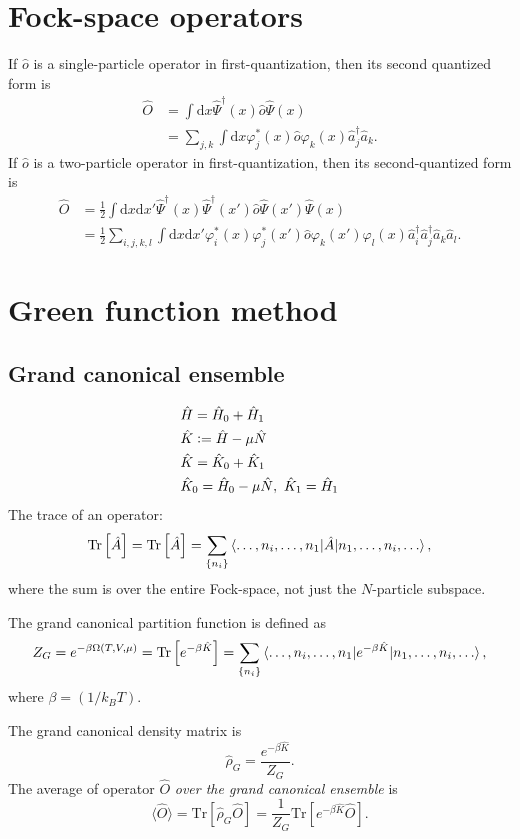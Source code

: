 \documentclass[11pt, a4paper]{article}
\newcommand{\dd}{\mathrm{d}}
\newcommand{\Tr}[1]{\mathrm{Tr}\left[#1\right]}
\begin{document}
\section{Fock-space operators}
If $\hat o$ is a single-particle operator in first-quantization, then its second quantized form is 
\begin{align*}
    \hat O &= \int\dd x\hat\Psi^{\dagger}(x)\hat o\hat\Psi(x) \\
    & = \sum\limits_{j,k} \int \dd x \varphi^*_j(x) \hat o \varphi_k(x) \hat a_j^{\dagger}\hat a_k.
\end{align*} 
If $\hat o$ is a two-particle operator in first-quantization, then its second-quantized form is 
\begin{align*}
    \hat O &= \frac{1}{2} \int\dd x \dd x' \hat\Psi^{\dagger}(x) \hat\Psi^{\dagger}(x') \hat o \hat\Psi(x') \hat\Psi(x) \\
    & = \frac{1}{2} \sum\limits_{i,j,k,l} \int\dd x \dd x' \varphi^*_i(x)\varphi^*_j(x') \hat o \varphi_k(x')\varphi_l(x)
    \hat a_i^{\dagger}\hat a_j^{\dagger}\hat a_k\hat a_l.
\end{align*}


\section{Green function method}
\subsection{Grand canonical ensemble}
\begin{align*}
    &\hat H = \hat H_0 + \hat H_1\\
    &\hat K \vcentcolon= \hat H - \mu \hat N\\
    &\hat K = \hat K_0 + \hat K_1\\
    &\hat K_0 = \hat H_0 - \mu \hat N, ~ \hat K_1 = \hat H_1
\end{align*}
The trace of an operator:
\begin{equation*}
    \Tr{\hat A} = \Tr{\hat A} = \sum\limits_{\{n_i\}}\braket{\dots, n_i, \dots, n_1 | \hat A |n_1, \dots, n_i, \dots},
\end{equation*}
where the sum is over the entire Fock-space, not just the $N$-particle subspace.
\par The grand canonical partition function is defined as 
\begin{equation*}
    Z_G = e^{-\beta\Omega(T,V,\mu)} = \Tr{e^{-\beta\hat K}} = 
    \sum\limits_{\{n_i\}}\braket{\dots, n_i, \dots, n_1 | e^{-\beta\hat K} |n_1, \dots, n_i, \dots},
\end{equation*}
where $\beta = (1/k_BT)$.
\par The grand canonical density matrix is 
\begin{equation*}
    \hat\rho_G = \frac{e^{-\beta\hat K}}{Z_G}.
\end{equation*}
The average of operator $\hat O$ \textit{over the grand canonical ensemble} is
\begin{equation*}
    \langle \hat O \rangle = \Tr{\hat \rho_G \hat O} = \frac{1}{Z_G}\Tr{e^{-\beta \hat K}\hat O}.
\end{equation*}
\end{document}
